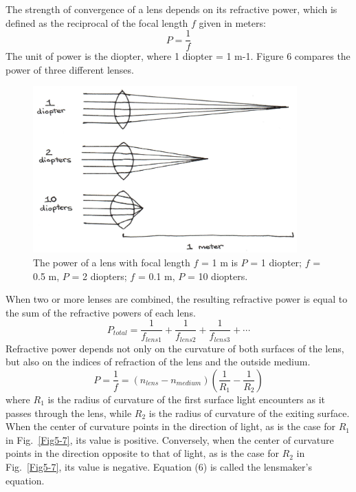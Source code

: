 The strength of convergence of a lens depends on its refractive power, which is defined as the reciprocal of the focal length $f$ given in meters:
\begin{equation}\label{eqn5-4}
P = \frac{1}{f}
\end{equation}
The unit of power is the diopter, where 1 diopter = 1 m-1.  Figure 6 compares the power of three different lenses. 
\begin{figure}[htb]
	\centering
	\includegraphics[width=4.0in]{./figures/Topic5/Fig5-6.jpg}
	\caption{The power of a lens with focal length $f$ = 1 m is $P$ = 1 diopter; $f$ = 0.5 m, $P$ = 2 diopters; $f$ = 0.1 m, $P$ = 10 diopters.}
	\label{Fig5-6}
\end{figure}
When two or more lenses are combined, the resulting refractive power is equal to the sum of the refractive powers of each lens.
\begin{equation}\label{eqn5-5}
P_{total} = \frac{1}{f_{lens1}}+\frac{1}{f_{lens2}}+\frac{1}{f_{lens3}}+\cdots
\end{equation}
Refractive power depends not only on the curvature of both surfaces of the lens, but also on the indices of refraction of the lens and the outside medium.  
\begin{equation}\label{eqn5-6}
P = \frac{1}{f} = \left(n_{lens}-n_{medium}\right)\left(\frac{1}{R_1}-\frac{1}{R_2}\right)
\end{equation}
where $R_1$ is the radius of curvature of the first surface light encounters as it passes through the lens, while $R_2$ is the radius of curvature of the exiting surface.  When the center of curvature points in the direction of light, as is the case for $R_1$ in Fig.~\ref{Fig5-7}, its value is positive. Conversely, when the center of curvature points in the direction opposite to that of light, as is the case for $R_2$ in Fig.~\ref{Fig5-7}, its value is negative. Equation (6) is called the lensmaker's equation.
